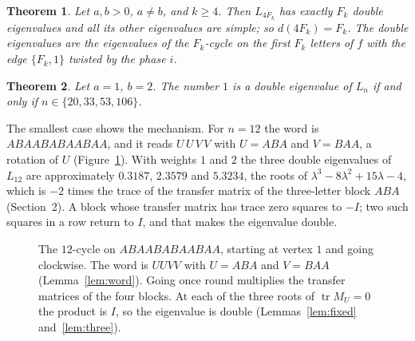 \documentclass[11pt]{amsart}
\newtheorem{theorem}{Theorem}[section]
\theoremstyle{definition}
\begin{document}
\begin{theorem}\label{thm:main}
Let $a,b>0$, $a\ne b$, and $k\ge4$. Then $L_{4F_k}$ has exactly $F_k$ double eigenvalues and all its other
eigenvalues are simple; so $d(4F_k)=F_k$. The double eigenvalues are the eigenvalues of the $F_k$-cycle on the
first $F_k$ letters of $f$ with the edge $\{F_k,1\}$ twisted by the phase $i$.
\end{theorem}

\begin{theorem}\label{thm:one}
Let $a=1$, $b=2$. The number $1$ is a double eigenvalue of $L_n$ if and only if $n\in\{20,33,53,106\}$.
\end{theorem}

The smallest case shows the mechanism. For $n=12$ the word is $ABAABABAABAA$, and it reads $U\,U\,V\,V$ with
$U=ABA$ and $V=BAA$, a rotation of $U$ (Figure~\ref{fig:cycle}). With weights $1$ and $2$ the three double
eigenvalues of $L_{12}$ are approximately $0.3187$, $2.3579$ and $5.3234$, the roots of $\lambda^3-8\lambda^2+15\lambda-4$, which
is $-2$ times the trace of the transfer matrix of the three-letter block $ABA$ (Section~2). A block whose transfer
matrix has trace zero squares to $-I$; two such squares in a row return to $I$, and that makes the eigenvalue double.

\begin{figure}[ht]
\centering
{}
\caption{The $12$-cycle on $ABAABABAABAA$, starting at vertex $1$ and going clockwise. The word is $UUVV$ with
$U=ABA$ and $V=BAA$ (Lemma~\ref{lem:word}). Going once round multiplies the transfer matrices of the four blocks.
At each of the three roots of $\operatorname{tr}M_U=0$ the product is $I$, so the eigenvalue is double
(Lemmas~\ref{lem:fixed} and~\ref{lem:three}).}
\label{fig:cycle}
\end{figure}
\end{document}
